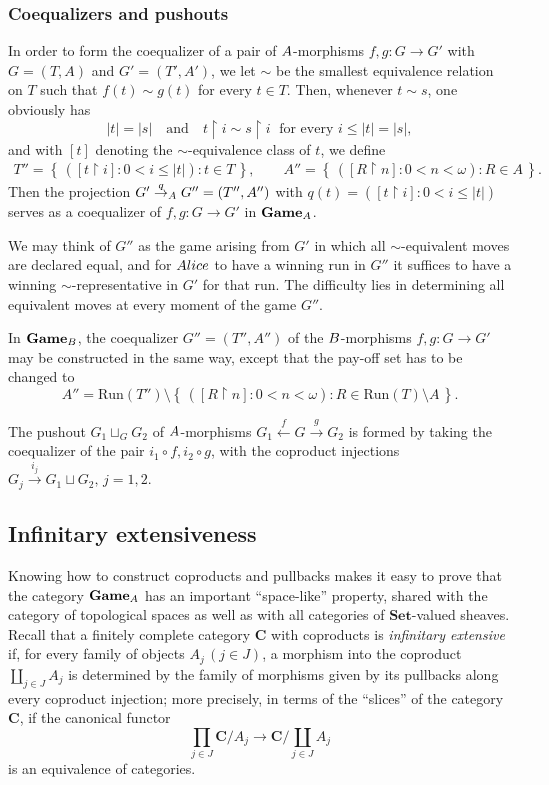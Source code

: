 \documentclass[12pt]{amsart}
\theoremstyle{definition}
\newcommand{\set}[1]{\left\{\, {#1} \,\right\}}
\newcommand{\seq}[1]{{\left( {#1} \right)}}
\newcommand{\ali}{\textup{\textmd{\textsc{Alice}}}}
\newcommand{\A}{\textup{\textmd{\textsc{A}}}}
\newcommand{\B}{\textup{\textmd{\textsc{B}}}}
\newcommand{\Run}{{\mathrm{Run}}}
\DeclareMathOperator{\restrict}{\upharpoonright}
\newcommand{\Sets}{\mathbf{Set}}
\newcommand{\Games}{\mathbf{Game}}
\begin{document}
\subsubsection{Coequalizers and pushouts}\label{SUBSEC_Coeq_Pushouts}
In order to form the coequalizer of a pair of $\A$-morphisms $f,g\colon G\to G'$ with $G=(T,A)$ and $G'=(T',A')$, we let $\sim$ be the smallest equivalence relation on $T$ such that $f(t)\sim g(t)$ for every $t\in T$. Then, whenever $t\sim s$, one obviously has
$$ |t|=|s|\quad\text{and}\quad t\restrict i\sim s\restrict i\;\text{ for every } i\le |t|=|s|,$$
and with $[t]$ denoting the $\sim$-equivalence class of $t$, we define
\begin{gather*}
	T'' =\set{\seq{[t\restrict i]:0<i\le|t|}: t\in T},\qquad
	A'' = \set{ \seq{[R\restrict n]:0<n<\omega}: R\in A}.
\end{gather*}
Then the projection $G'\stackrel{q}{\to}_\A G''=(T'',A'')$ with $q(t)=\seq{[t\restrict i]:0<i\le|t|}$ serves  as a coequalizer of $f,g\colon G\to G'$ in $\Games_\A$.

We may think of $G''$ as the game arising from $G'$ in which all $\sim$-equivalent moves are declared equal, and for $\ali$ to have a winning run in $G''$ it suffices to have a winning $\sim$-representative in $G'$ for that run. The difficulty lies in determining all equivalent moves at every moment of the game $G''$.

In $\Games_\B$, the coequalizer $G'' =(T'',A'')$ of the $\B$-morphisms $f,g:G\to G'$ may be constructed in the same way, except that the pay-off set has to be changed to
\[
A'' = \Run(T'')\setminus \set{ \seq{[R\restrict n]:0< n<\omega}: R\in \Run(T)\setminus A}.
\]

The pushout $G_1\sqcup_GG_2$ of $\A$-morphisms $G_1\stackrel{f}{\leftarrow}G\stackrel{g}{\to}G_2$ is formed by taking the coequalizer 
of the pair $i_1\circ f, i_2\circ g$, 
with the coproduct injections  
$G_j\stackrel{i_j}{\to} G_1\sqcup G_2,\,j=1,2$. 



\subsection{Infinitary extensiveness}

Knowing how to construct coproducts and pullbacks makes it easy to prove that the category $\Games_\A$ has an important ``space-like'' property, shared with the category of topological spaces as well as with all categories of $\Sets$-valued sheaves.
Recall that a finitely complete category $\mathbf C$ with coproducts is {\em infinitary extensive}  \cite{Carboni1993, Centazzo2004}  if, for every family of objects $A_j\,(j\in J)$, a morphism into the coproduct $\coprod_{j\in J}A_j$ is determined by the family of morphisms given by its pullbacks along every coproduct injection; more precisely, in terms of the ``slices'' of the category $\mathbf C$, if the canonical functor
$$\prod_{j\in J}\mathbf C/A_j\longrightarrow\mathbf C/\coprod_{j\in J}A_j$$
is an equivalence of categories.
\end{document}
